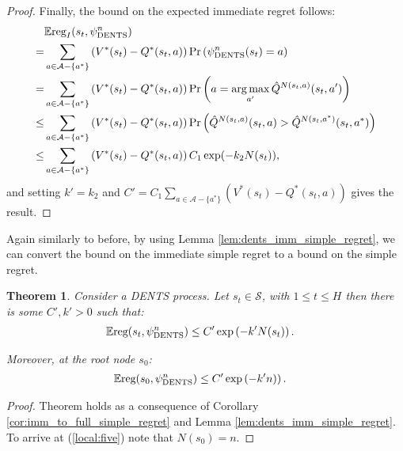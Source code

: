 \documentclass{article}
\newcommand{\bb}[1]{\mathbb{#1}}
\newcommand{\cl}[1]{\mathcal{#1}}
\newcommand{\Qt}[3]{\hat{Q}^{#3}(#1,#2)}
\newcommand{\reg}{\textnormal{reg}}
\DeclareMathOperator*{\argmax}{arg\,max}
\theoremstyle{plain}
\newtheorem{theorem}{Theorem}[section]
\begin{document}
\begin{appendices}
\begin{proof}
            Finally, the bound on the expected immediate regret follows:
            \begin{align}
                & \bb{E}\reg_I(s_t,\psi^n_{\text{DENTS}})  \\
                    =& \sum_{a\in\cl{A}-\{a^*\}} 
                        \left(V^*(s_t)-Q^*(s_t,a)\right) \Pr\left(\psi^n_{\text{DENTS}}(s_t) =a \right) \\
                    =& \sum_{a\in\cl{A}-\{a^*\}} 
                        \left(V^*(s_t)-Q^*(s_t,a)\right) \Pr\left(a = \argmax_{a'} \Qt{s_t}{a'}{N(s_t,a)} \right) \\
                    \leq& \sum_{a\in\cl{A}-\{a^*\}} 
                        \left(V^*(s_t)-Q^*(s_t,a)\right) \Pr\left(\Qt{s_t}{a}{N(s_t,a)} > \Qt{s_t}{a^*}{N(s_t,a^*)}  \right) \\
                    \leq&  \sum_{a\in\cl{A}-\{a^*\}} 
                        \left(V^*(s_t)-Q^*(s_t,a)\right) C_1 \exp(-k_2N(s_t)),
            \end{align}
            and setting $k'=k_2$ and $C'=C_1\sum_{a\in\cl{A}-\{a^*\}} \left(V^*(s_t)-Q^*(s_t,a)\right)$ gives the result.
        \end{proof}









    
        Again similarly to before, by using Lemma \ref{lem:dents_imm_simple_regret}, we can convert the bound on the immediate simple regret to a bound on the simple regret.
        
        \begin{theorem} \label{thrm:dents_simple_regret_converge}
            Consider a DENTS process. Let $s_t\in\cl{S}$, with $1\leq t \leq H$ then there is some $C',k'>0$ such that:
            \begin{align}
                \bb{E} \reg(s_{t},\psi^n_{\textnormal{DENTS}}) &\leq C'\exp\left( -k' N(s_{t}) \right).
            \end{align}
            
            Moreover, at the root node $s_0$:
            \begin{align}
                \bb{E} \reg(s_{0},\psi^n_{\textnormal{DENTS}}) &\leq C'\exp\left( -k'n) \right). \label{local:five}
            \end{align}
        \end{theorem}
        \begin{proof}
            Theorem holds as a consequence of Corollary \ref{cor:imm_to_full_simple_regret} and Lemma \ref{lem:dents_imm_simple_regret}. To arrive at (\ref{local:five}) note that $N(s_0)=n$.
        \end{proof}







\end{appendices}
\end{document}
